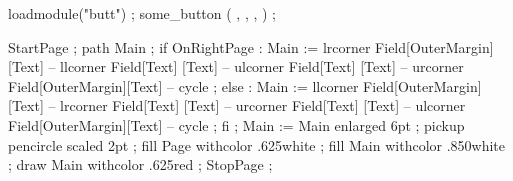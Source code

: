 \startbuffer[shape-b]
\stopbuffer

\startbuffer[shape-c]

\stopbuffer

\startbuffer[symb-a]
  loadmodule("butt") ;
  some_button ( ,
                ,
                ,
                 ) ;
\stopuniqueMPgraphic
\stopbuffer

\startbuffer[symb-b]
\stopbuffer

\startbuffer[symb-c]

\stopbuffer


\startbuffer[pagetext]
\subject{Edward  R. Tufte}         \par
\subject{Donald  E. Knuth}         \par
\subject{Douglas R. Hostadter}   \page
\stopbuffer

\startbuffer[back-0]
\setupbackgrounds[page][background=page]
\stopbuffer

\startbuffer[back-1]
  StartPage ;
    path Main ;
    if OnRightPage :
      Main := lrcorner Field[OuterMargin][Text] --
              llcorner Field[Text]       [Text] --
              ulcorner Field[Text]       [Text] --
              urcorner Field[OuterMargin][Text] -- cycle ;
    else :
      Main := llcorner Field[OuterMargin][Text] --
              lrcorner Field[Text]       [Text] --
              urcorner Field[Text]       [Text] --
              ulcorner Field[OuterMargin][Text] -- cycle ;
    fi ;
    Main := Main enlarged 6pt ;
    pickup pencircle scaled 2pt ;
    fill Page withcolor .625white ;
    fill Main withcolor .850white ;
    draw Main withcolor .625red ;
  StopPage ;
\stopuseMPgraphic
\stopbuffer

